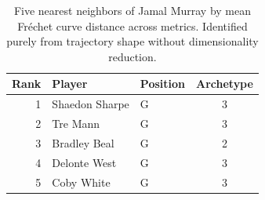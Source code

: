 \begin{table}[htbp]
  \centering\small
  \begin{tabular}{rllc}
    \toprule
    Rank & Player & Position & Archetype \\
    \midrule
    1 & Shaedon Sharpe & G & 3 \\
    2 & Tre Mann & G & 3 \\
    3 & Bradley Beal & G & 2 \\
    4 & Delonte West & G & 3 \\
    5 & Coby White & G & 3 \\
    \bottomrule
  \end{tabular}
  \caption{Five nearest neighbors of Jamal Murray by mean Fr\'{e}chet curve distance across metrics. Identified purely from trajectory shape without dimensionality reduction.}
  \label{tab:Jamal_Murray_frechet_curve_neighbors}
\end{table}

